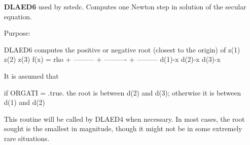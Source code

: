 {\bfseries D\+L\+A\+E\+D6} used by sstedc. Computes one Newton step in solution of the secular equation. 

 \begin{DoxyParagraph}{Purpose\+: }
\begin{DoxyVerb} DLAED6 computes the positive or negative root (closest to the origin)
 of
                  z(1)        z(2)        z(3)
 f(x) =   rho + --------- + ---------- + ---------
                 d(1)-x      d(2)-x      d(3)-x

 It is assumed that

       if ORGATI = .true. the root is between d(2) and d(3);
       otherwise it is between d(1) and d(2)

 This routine will be called by DLAED4 when necessary. In most cases,
 the root sought is the smallest in magnitude, though it might not be
 in some extremely rare situations.\end{DoxyVerb}
 
\end{DoxyParagraph}

